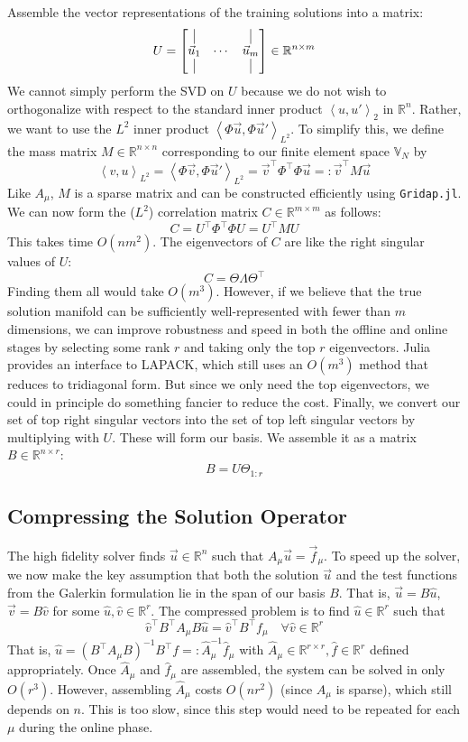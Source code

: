 \documentclass[11pt]{article}
\newcommand{\R}{\mathbb{R}}
\newcommand{\inner}[1]{\left \langle #1 \right \rangle}
\begin{document}
Assemble the vector representations of the training solutions into a matrix:
\[ U = \begin{bmatrix}\vline && \vline \\ \vec u_1 & \cdots & \vec u_m \\\vline && \vline \end{bmatrix} \in \R^{n \times m} \]
We cannot simply perform the SVD on $U$ because we do not wish to orthogonalize with respect to the standard inner product $\inner{u, u'}_2$ in $\R^n$.
Rather, we want to use the $L^2$ inner product $\inner{\Phi \vec u, \Phi \vec u'}_{L^2}$.
To simplify this, we define the mass matrix $M \in \R^{n \times n}$ corresponding to our finite element space $\mathbb V_N$ by
\[ \inner{v, u}_{L^2} = \inner{\Phi \vec v, \Phi \vec u'}_{L^2} = \vec v^\top \Phi^\top \Phi \vec u =: \vec v^\top M \vec u \]
Like $A_{\mu}$, $M$ is a sparse matrix and can be constructed efficiently using \texttt{Gridap.jl}.
We can now form the ($L^2$) correlation matrix $C \in \R^{m \times m}$ as follows:
\[ C = U^\top \Phi^\top \Phi U = U^\top M U \]
This takes time $O(nm^2)$.
The eigenvectors of $C$ are like the right singular values of $U$:
\[ C = \Theta \Lambda \Theta^\top \]
Finding them all would take $O(m^3)$. However, if we believe that the
true solution manifold can be sufficiently well-represented with fewer than $m$
dimensions, we can improve robustness and speed in both the offline and online stages
by selecting some rank $r$ and taking only the top $r$ eigenvectors.
Julia provides an interface to LAPACK, which still uses an $O(m^3)$
method that reduces to tridiagonal form. But since we only need the top eigenvectors,
we could in principle do something fancier to reduce the cost.
Finally, we convert our set of top right singular vectors into the set of top left singular vectors
by multiplying with $U$.
These will form our basis. We assemble it as a matrix $B \in \R^{n \times r}$:
\[ B = U \Theta_{1:r} \]

\subsection{Compressing the Solution Operator}
The high fidelity solver finds $\vec u \in \R^n$ such that $A_{\mu} \vec u = \vec f_{\mu}$.
To speed up the solver, we now make the key assumption that both the solution $\vec u$ and 
the test functions from the Galerkin formulation lie in the span of our basis $B$.
That is, $\vec u  = B \widehat u$, $\vec v = B \widehat v$ for some $\widehat u, \widehat v \in \R^r$.
The compressed problem is to find $\widehat u \in \R^r$ such that
\[ \widehat v^\top B^\top A_{\mu} B \widehat u = \widehat v^\top B^\top f_{\mu} \quad \forall \widehat v \in \R^r \]
That is, $\widehat u = (B^\top A_{\mu} B)^{-1} B^\top f =: \widehat A_{\mu}^{-1} \widehat f_{\mu}$ with $\widehat A_{\mu} \in \R^{r \times r}, \widehat f \in \R^{r}$ defined appropriately.
Once $\widehat A_{\mu}$ and $\widehat f_{\mu}$ are assembled, the system can be solved in only $O(r^3)$.
However, assembling $\widehat A_{\mu}$ costs $O(nr^2)$ (since $A_{\mu}$ is sparse),
which still depends on $n$. This is too slow, since this step would need to be repeated for each $\mu$ during the online phase.\\
\end{document}
